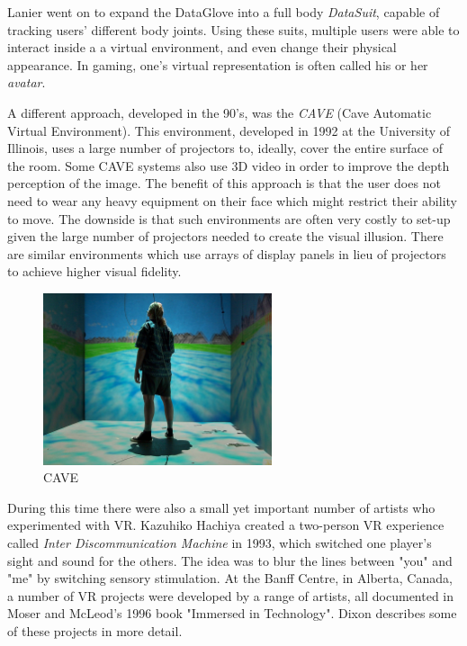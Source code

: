 Lanier went on to expand the DataGlove into a full body \textit{DataSuit}, capable of tracking users' different body joints. Using these suits, multiple users were able to interact inside a a virtual environment, and even change their physical appearance. In gaming, one's virtual representation is often called his or her \textit{avatar}.

A different approach, developed in the 90's, was the \textit{CAVE} (Cave Automatic Virtual Environment). This environment, developed in 1992 at the University of Illinois, uses a large number of projectors to, ideally, cover the entire surface of the room. Some CAVE systems also use 3D video in order to improve the depth perception of the image. The benefit of this approach is that the user does not need to wear any heavy equipment on their face which might restrict their ability to move. The downside is that such environments are often very costly to set-up given the large number of projectors needed to create the visual illusion. There are similar environments which use arrays of display panels in lieu of projectors to achieve higher visual fidelity.

\begin{figure}[ht!]%
\centering
\includegraphics[width=0.6\textwidth]{img/cave.jpg} 
\caption{CAVE \cite{FileCAVE71online}}
\label{img:cave}
\end{figure}

During this time there were also a small yet important number of artists who experimented with VR. Kazuhiko Hachiya created a two-person VR experience called \textit{Inter Discommunication Machine} in 1993, which switched one player's sight and sound for the others. The idea was to blur the lines between "you" and "me" \cite{dixon2006history} by switching sensory stimulation. At the Banff Centre, in Alberta, Canada, a number of VR projects were developed by a range of artists, all documented in Moser and McLeod's 1996 book "Immersed in Technology". Dixon \cite{dixon2006history} describes some of these projects in more detail. 

